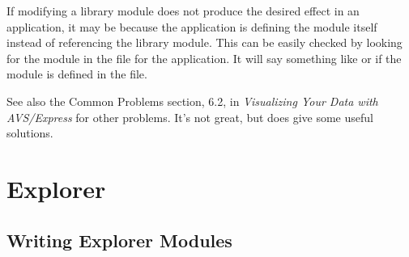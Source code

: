 If modifying a library module does not produce the desired effect in an
application, it may be because the application is defining the module itself
instead of referencing the library module.  This can be easily checked by
looking for the module in the  file for the application.  It will say
something like  or  if the
module is defined in the file.

See also the Common Problems section, 6.2, in {\it Visualizing Your Data with
AVS/Express} for other problems.  It's not great, but does give some useful
solutions.



\section{Explorer}
\label{Explorer}


\subsection{Writing Explorer Modules}
\label{Writing Explorer Modules}

